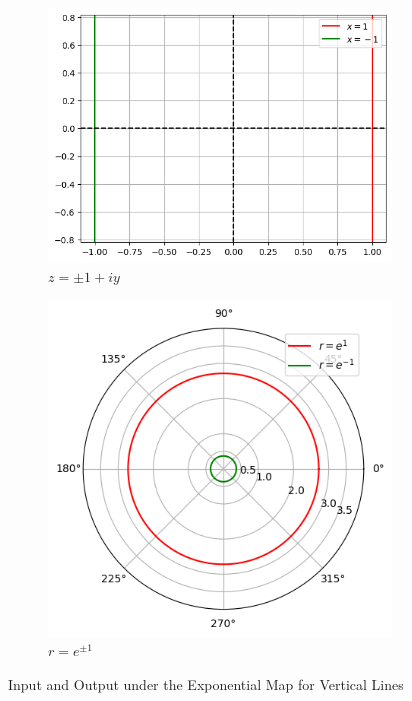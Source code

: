 \begin{figure}[htbp]
    \centering
    \begin{subfigure}[b]{0.45\textwidth}
        \centering
        \includegraphics[width=\linewidth]{FIG_MAT215/exp z vertical lines.png}
        \caption{$z = \pm 1+iy$}
        \label{fig:exp_inputs_h}
    \end{subfigure}
    \hfill
    \begin{subfigure}[b]{0.45\textwidth}
        \centering
        \includegraphics[width=\linewidth]{FIG_MAT215/exp z vertical lines out.png}
        \caption{$r=e^{\pm1}$}
        \label{fig:exp_outputs_h}
    \end{subfigure}
    \caption{Input and Output under the Exponential Map for Vertical Lines}
    \label{fig:exp_map_vertical_lines}
\end{figure}
